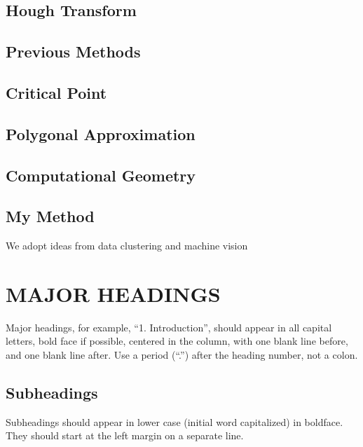 \documentclass{article}
\begin{document}
\subsection{Hough Transform}
\label{sub:Hough Transform}

\subsection{Previous Methods}
\label{sub:Previous Methods}

\subsection{Critical Point}
\label{sub:Critical Point}

\subsection{Polygonal Approximation}

\subsection{Computational Geometry}
\label{sub:Computational Geometry}

\subsection{My Method}
\label{sub:My Method}

We adopt ideas from data clustering and machine vision

\section{MAJOR HEADINGS}
\label{sec:majhead}

Major headings, for example, ``1. Introduction'', should appear in all capital
letters, bold face if possible, centered in the column, with one blank line
before, and one blank line after. Use a period (``.'') after the heading number,
not a colon.

\subsection{Subheadings}
\label{ssec:subhead}

Subheadings should appear in lower case (initial word capitalized) in
boldface.  They should start at the left margin on a separate line.
\end{document}
